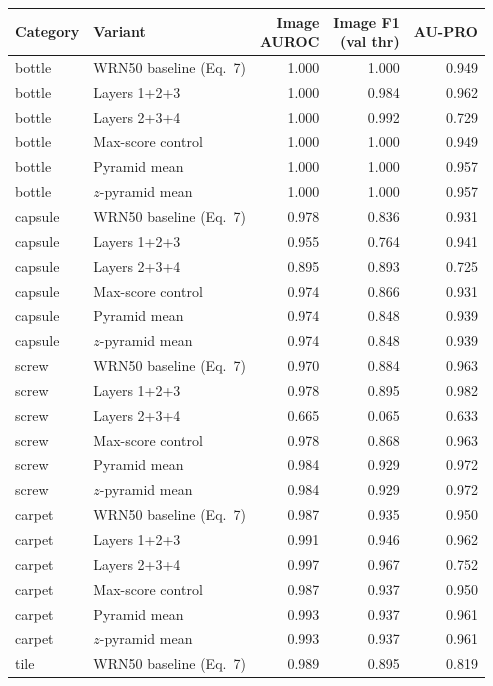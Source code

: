 \begin{tabular}{@{}llrrr@{}}
\toprule
Category & Variant & \shortstack{Image\\AUROC} & \shortstack{Image F1\\(val thr)} & AU-PRO \\
\midrule
bottle & WRN50 baseline (Eq.~7) & 1.000 & 1.000 & 0.949 \\
bottle & Layers 1+2+3 & 1.000 & 0.984 & 0.962 \\
bottle & Layers 2+3+4 & 1.000 & 0.992 & 0.729 \\
bottle & Max-score control & 1.000 & 1.000 & 0.949 \\
bottle & Pyramid mean & 1.000 & 1.000 & 0.957 \\
bottle & $z$-pyramid mean & 1.000 & 1.000 & 0.957 \\
\midrule
capsule & WRN50 baseline (Eq.~7) & 0.978 & 0.836 & 0.931 \\
capsule & Layers 1+2+3 & 0.955 & 0.764 & 0.941 \\
capsule & Layers 2+3+4 & 0.895 & 0.893 & 0.725 \\
capsule & Max-score control & 0.974 & 0.866 & 0.931 \\
capsule & Pyramid mean & 0.974 & 0.848 & 0.939 \\
capsule & $z$-pyramid mean & 0.974 & 0.848 & 0.939 \\
\midrule
screw & WRN50 baseline (Eq.~7) & 0.970 & 0.884 & 0.963 \\
screw & Layers 1+2+3 & 0.978 & 0.895 & 0.982 \\
screw & Layers 2+3+4 & 0.665 & 0.065 & 0.633 \\
screw & Max-score control & 0.978 & 0.868 & 0.963 \\
screw & Pyramid mean & 0.984 & 0.929 & 0.972 \\
screw & $z$-pyramid mean & 0.984 & 0.929 & 0.972 \\
\midrule
carpet & WRN50 baseline (Eq.~7) & 0.987 & 0.935 & 0.950 \\
carpet & Layers 1+2+3 & 0.991 & 0.946 & 0.962 \\
carpet & Layers 2+3+4 & 0.997 & 0.967 & 0.752 \\
carpet & Max-score control & 0.987 & 0.937 & 0.950 \\
carpet & Pyramid mean & 0.993 & 0.937 & 0.961 \\
carpet & $z$-pyramid mean & 0.993 & 0.937 & 0.961 \\
\midrule
tile & WRN50 baseline (Eq.~7) & 0.989 & 0.895 & 0.819 \\

\end{tabular}
